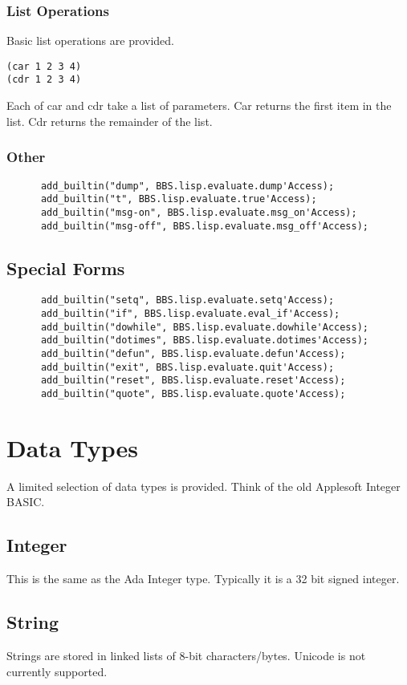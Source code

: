 \documentclass[10pt, openany]{book}
\begin{document}
\subsubsection{List Operations}
Basic list operations are provided.
\begin{lstlisting}
(car 1 2 3 4)
(cdr 1 2 3 4)
\end{lstlisting}
Each of car and cdr take a list of parameters.  Car returns the first item in the list.  Cdr returns the remainder of the list.

\subsubsection{Other}
\lstset{language=Ada}
\begin{lstlisting}
      add_builtin("dump", BBS.lisp.evaluate.dump'Access);
      add_builtin("t", BBS.lisp.evaluate.true'Access);
      add_builtin("msg-on", BBS.lisp.evaluate.msg_on'Access);
      add_builtin("msg-off", BBS.lisp.evaluate.msg_off'Access);
\end{lstlisting}

\subsection{Special Forms}
\begin{lstlisting}
      add_builtin("setq", BBS.lisp.evaluate.setq'Access);
      add_builtin("if", BBS.lisp.evaluate.eval_if'Access);
      add_builtin("dowhile", BBS.lisp.evaluate.dowhile'Access);
      add_builtin("dotimes", BBS.lisp.evaluate.dotimes'Access);
      add_builtin("defun", BBS.lisp.evaluate.defun'Access);
      add_builtin("exit", BBS.lisp.evaluate.quit'Access);
      add_builtin("reset", BBS.lisp.evaluate.reset'Access);
      add_builtin("quote", BBS.lisp.evaluate.quote'Access);
\end{lstlisting}

\section{Data Types}
A limited selection of data types is provided.  Think of the old Applesoft Integer BASIC.

\subsection{Integer}
This is the same as the Ada Integer type.  Typically it is a 32 bit signed integer.

\subsection{String}
Strings are stored in linked lists of 8-bit characters/bytes.  Unicode is not currently supported.
\end{document}
